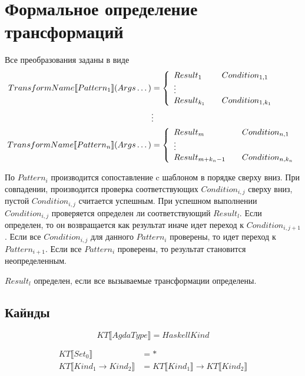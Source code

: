 \section{Формальное определение трансформаций}\label{sec:appendix-transformations}

Все преобразования заданы в виде
\begin{align*}
TransformName\llbracket Pattern_1 \rrbracket(Args\dots) &= \left\{
   \begin{array}{l l}
   Result_1 &\quad Condition_{1,1}\\
   \vdots\\
   Result_{k_1} &\quad Condition_{1,k_1}
   \end{array}\right.\\
&\vdots\\
TransformName\llbracket Pattern_n \rrbracket(Args\dots) &= \left\{
   \begin{array}{l l}
   Result_m &\quad Condition_{n,1}\\
   \vdots\\
   Result_{m+k_n-1} &\quad Condition_{n,k_n}
   \end{array}\right.
\end{align*}

По \(Pattern_i\) производится сопоставление c шаблоном в порядке сверху вниз.
При совпадении, производится проверка соответствующих \(Condition_{i,j}\) сверху вниз,
пустой \(Condition_{i,j}\) считается успешным.
При успешном выполнении \(Condition_{i,j}\) проверяется определен ли соответствующий
\(Result_l\). Если определен, то он возвращается как результат иначе идет переход
к \(Condition_{i,j+1}\). Если все \(Condition_{i,j}\) для данного \(Pattern_i\)
проверены, то идет переход к \(Pattern_{i+1}\). Если все \(Pattern_i\) проверены,
то результат становится неопределенным.

\(Result_l\) определен, если все вызываемые трансформации определены.

\subsection{Кайнды}
\[
KT\llbracket AgdaType \rrbracket = HaskellKind
\]

\begin{align*}
KT\llbracket Set_0 \rrbracket &= *\\
KT\llbracket Kind_1 \rightarrow Kind_2 \rrbracket &=
   KT\llbracket Kind_1 \rrbracket \rightarrow KT\llbracket Kind_2 \rrbracket
\end{align*}

